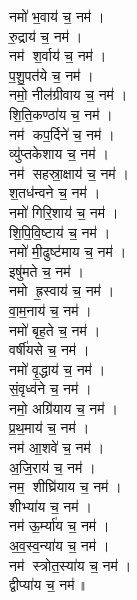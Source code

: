 \begin{multicols}{2}
\begin{flushleft}
नमो॑ भ॒वाय॑ च॒ नम॑।\\
रु॒द्राय॑ च॒ नम॑।\\
नम॑ श॒र्वाय॑ च॒ नम॑।\\
प॒शु॒पत॑ये च॒ नम॑।\\
नमो॒ नील॑ग्रीवाय च॒ नम॑।\\
शि॒ति॒कण्ठा॑य च॒ नम॑।\\
नम॑ कप॒र्दिने॑ च॒ नम॑।\\
व्यु॑प्तकेशाय च॒ नम॑।\\
नम॑ सहस्रा॒क्षाय॑ च॒ नम॑।\\
श॒तध॑न्वने च॒ नम॑।\hfill {}\\
नमो॑ गिरि॒शाय॑ च॒ नम॑।\\
शि॒पि॒वि॒ष्टाय॑ च॒ नम॑।\\
नमो॑ मी॒ढुष्ट॑माय च॒ नम॑।\\
इषु॑मते च॒ नम॑।\\
नमो ह्र॒स्वाय॑ च॒ नम॑।\\
वा॒म॒नाय॑ च॒ नम॑।\\
नमो॑ बृह॒ते च॒ नम॑।\\
वर्षी॑यसे च॒ नम॑।\\
नमो॑ वृ॒द्धाय॑ च॒ नम॑।\\
सं॒वृध्व॑ने च॒ नम॑।\hfill {}\\
नमो॒ अग्रि॑याय च॒ नम॑।\\
प्र॒थ॒माय॑ च॒ नम॑।\\
नम॑ आ॒शवे॑ च॒ नम॑।\\
अ॒जि॒राय॑ च॒ नम॑।\\
नम॒ शीघ्रि॑याय च॒ नम॑।\\
शीभ्या॑य च॒ नम॑।\\
नम॑ ऊ॒र्म्या॑य च॒ नम॑।\\
अ॒व॒स्व॒न्या॑य च॒ नम॑।\\
नम॑ स्त्रोत॒स्या॑य च॒ नम॑।\\
द्वीप्या॑य च॒ नम॑॥\hfill {}\\


\end{flushleft}
\end{multicols}

